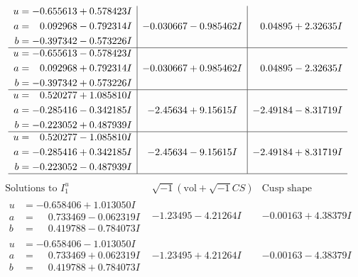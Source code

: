 \documentclass[1p]{elsarticle_modified}
\theoremstyle{definition}
\newcommand{\I}{\sqrt{-1}}
\begin{document}
$$\begin{array}{c|c|c}
\begin{aligned}
u &= -0.655613 + 0.578423 I \\
a &= \phantom{-}0.092968 - 0.792314 I \\
b &= -0.397342 - 0.573226 I\end{aligned}
 & -0.030667 - 0.985462 I & \phantom{-}0.04895 + 2.32635 I \\ \hline\begin{aligned}
u &= -0.655613 - 0.578423 I \\
a &= \phantom{-}0.092968 + 0.792314 I \\
b &= -0.397342 + 0.573226 I\end{aligned}
 & -0.030667 + 0.985462 I & \phantom{-}0.04895 - 2.32635 I \\ \hline\begin{aligned}
u &= \phantom{-}0.520277 + 1.085810 I \\
a &= -0.285416 - 0.342185 I \\
b &= -0.223052 + 0.487939 I\end{aligned}
 & -2.45634 + 9.15615 I & -2.49184 - 8.31719 I \\ \hline\begin{aligned}
u &= \phantom{-}0.520277 - 1.085810 I \\
a &= -0.285416 + 0.342185 I \\
b &= -0.223052 - 0.487939 I\end{aligned}
 & -2.45634 - 9.15615 I & -2.49184 + 8.31719 I\\
 \hline 
 \end{array}$$\newpage$$\begin{array}{c|c|c}  
\text{Solutions to }I^u_{1}& \I (\text{vol} + \sqrt{-1}CS) & \text{Cusp shape}\\
 \hline 
\begin{aligned}
u &= -0.658406 + 1.013050 I \\
a &= \phantom{-}0.733469 - 0.062319 I \\
b &= \phantom{-}0.419788 - 0.784073 I\end{aligned}
 & -1.23495 - 4.21264 I & -0.00163 + 4.38379 I \\ \hline\begin{aligned}
u &= -0.658406 - 1.013050 I \\
a &= \phantom{-}0.733469 + 0.062319 I \\
b &= \phantom{-}0.419788 + 0.784073 I\end{aligned}
 & -1.23495 + 4.21264 I & -0.00163 - 4.38379 I \\ \hline\begin{aligned}

\end{aligned}
\end{array}$$
\end{document}
